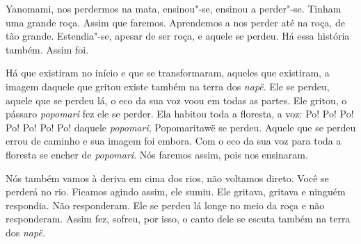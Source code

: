  

 Yanomami, nos perdermos na mata, ensinou"-se,
ensinou a perder"-se. Tinham uma grande roça. Assim que faremos.
Aprendemos a nos perder até na roça, de tão grande. Estendia"-se, apesar
de ser roça, e aquele se perdeu. Há essa história também. Assim foi. 

Há que existiram no início e que se transformaram, aqueles que
existiram, a imagem daquele que gritou existe também na terra
dos \emph{napë}. Ele se perdeu, aquele que se perdeu lá, o eco da sua
voz voou em todas as partes. Ele gritou, o pássaro \emph{popomari} fez
ele se perder. Ela habitou toda a floresta, a voz: Po! Po! Po! Po! Po!
Po! Po! daquele \emph{popomari}, Popomaritawë se perdeu. Aquele que se
perdeu errou de caminho e sua imagem foi embora. Com o eco da sua voz
para toda a floresta se encher de \emph{popomari}. Nós faremos assim,
pois nos ensinaram. 

Nós também vamos à deriva em cima dos rios, não voltamos direto. Você se
perderá no rio. Ficamos agindo assim, ele sumiu. Ele gritava, gritava e
ninguém respondia. Não responderam. Ele se perdeu lá longe no meio da
roça e não responderam. Assim fez, sofreu, por isso, o canto dele se
escuta também na terra dos \emph{napë.}

 
